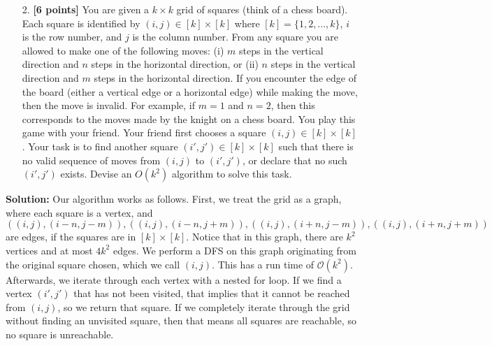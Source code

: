 \documentclass{assignment-263}
\begin{document}
  \begin{enumerate}
    \item[2.] \textbf{[6 points]}
    You are given a $k \times k$ grid of squares (think of a chess board). Each square is identified by $(i,j) \in [k] \times [k]$ where $[k] = \{1,2,...,k\}$, $i$ is the row number, and $j$ is the column number. From any square you are allowed to make one of the following moves: (i) $m$ steps in the vertical direction and $n$ steps in the horizontal direction, or (ii) $n$ steps in the vertical direction and $m$ steps in the horizontal direction. If you encounter the edge of the board (either a vertical edge or a horizontal edge) while making the move, then the move is invalid. For example, if $m = 1$ and $n = 2$, then this corresponds to the moves made by the knight on a chess board. You play this game with your friend. Your friend first chooses a square $(i,j) \in [k]\times [k]$. Your task is to find another square $(i',j') \in [k] \times [k]$ such that there is no valid sequence of moves from $(i,j)$ to $(i',j')$, or declare that no such $(i',j')$ exists. Devise an $O(k^2)$ algorithm to solve this task.
 \end{enumerate}

 \textbf{Solution:} Our algorithm works as follows. First, we treat the grid as a graph, where each square is a vertex, and
 \[
  ((i,j), (i - n, j - m)),((i,j), (i - n, j + m)),((i,j), (i + n, j - m)),((i,j), (i + n, j + m))
 \]
 are edges, if the squares are in \([k]\times [k]\). Notice that in this graph, there are \(k^2\) vertices and at most \(4k^2\) edges. We perform a DFS on this graph originating from the original square chosen, which we call \((i,j)\). This has a run time of \(\mathcal{O} (k^2)\). Afterwards, we iterate through each vertex with a nested for loop. If we find a vertex \((i', j')\) that has not been visited, that implies that it cannot be reached from \((i,j)\), so we return that square. If we completely iterate through the grid without finding an unvisited square, then that means all squares are reachable, so no square is unreachable.

\program
\end{document}
